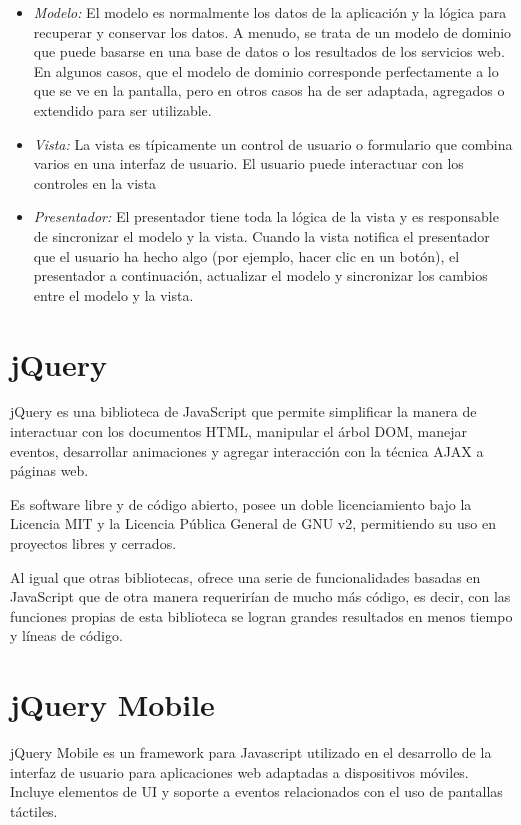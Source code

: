  \begin{itemize}
    \item \emph {Modelo:} El modelo es normalmente los datos de la aplicación y la lógica para recuperar y conservar los datos. A menudo, se trata de un modelo de dominio que puede basarse en una base de datos o los resultados de los servicios web. En algunos casos, que el modelo de dominio corresponde perfectamente a lo que se ve en la pantalla, pero en otros casos ha de ser adaptada, agregados o extendido para ser utilizable.
    
    \item \emph {Vista:} La vista es típicamente un control de usuario o formulario que combina varios en una interfaz de usuario. El usuario puede interactuar con los controles en la vista
    
   \item \emph {Presentador:} El presentador tiene toda la lógica de la vista y es responsable de sincronizar el modelo y la vista. Cuando la vista notifica el presentador que el usuario ha hecho algo (por ejemplo, hacer clic en un botón), el presentador a continuación, actualizar el modelo y sincronizar los cambios entre el modelo y la vista.

      
 \end{itemize}


\section{jQuery}

jQuery es una biblioteca de \gls{JavaScript} que permite simplificar la manera de interactuar con los documentos \gls{HTML}, manipular el árbol \gls{DOM}, manejar eventos, desarrollar animaciones y agregar interacción con la técnica \gls{AJAX} a páginas web.

Es software libre y de código abierto, posee un doble licenciamiento bajo la Licencia MIT y la Licencia Pública General de GNU v2, permitiendo su uso en proyectos libres y cerrados.

Al igual que otras bibliotecas, ofrece una serie de funcionalidades basadas en JavaScript que de otra manera requerirían de mucho más código, es decir, con las funciones propias de esta biblioteca se logran grandes resultados en menos tiempo y líneas de código.

\section{jQuery Mobile}
jQuery Mobile es un \gls{framework} para Javascript utilizado en el desarrollo de la interfaz de usuario para aplicaciones web adaptadas a dispositivos móviles. Incluye elementos de UI y soporte a eventos relacionados con el uso de pantallas táctiles.

